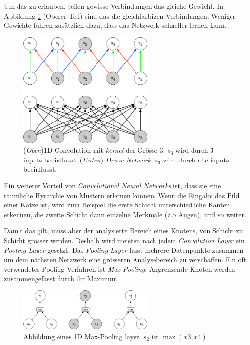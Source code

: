 Um das zu erlauben, teilen gewisse Verbindungen das gleiche Gewicht. In Abbildung \ref{img:conv} (Oberer Teil) sind das die gleichfarbigen Verbindungen. Weniger Gewichte führen zusätzlich dazu, dass das Netzwerk schneller lernen kann.
\begin{figure}[hbt]
	\centering
		\includegraphics[width=0.6\textwidth]{assets/conv_1d.png}
	\caption{(\textit{Oben})1D Convolution mit \textit{kernel} der Grösse 3. $s_3$ wird durch 3 inputs beeinflusst.
		     (\textit{Unten}) \textit{Dense Network}. $s_3$ wird durch alle inputs beeinflusst.\parencite{goodfellow}}
	\label{img:conv}
\end{figure}

Ein weiterer Vorteil von \textit{Convolutional Neural Networks} ist, dass sie eine räumliche Hyrarchie von Mustern erlernen können. Wenn die Eingabe das Bild einer Katze ist, wird zum Beispiel die erste Schicht unterschiedliche Kanten erkennen, die zweite Schicht dann einzelne Merkmale (z.b Augen), und so weiter.

Damit das gilt, muss aber der analysierte Bereich eines Knotens, von Schicht zu Schicht grösser werden. Deshalb wird meisten nach jedem \textit{Convolution Layer} ein \textit{Pooling Layer} gesetzt. Das \textit{Pooling Layer} fasst mehrere Datenpunkte zusammen um dem nächsten Netzwerk eine grösseren Analysebereich zu verschaffen. Ein oft verwendetes Pooling-Verfahren ist \textit{Max-Pooling}: Angrenzende Knoten werden zusammengefasst durch ihr Maximum. 
\begin{figure}[hbt]
	\centering
		\includegraphics[width=0.6\textwidth]{assets/pooling_1d.png}
	\caption{Abbildung eines 1D Max-Pooling layer. $s_2$ ist $\max (x3, x4)$}
	\label{img:pool}
\end{figure}


